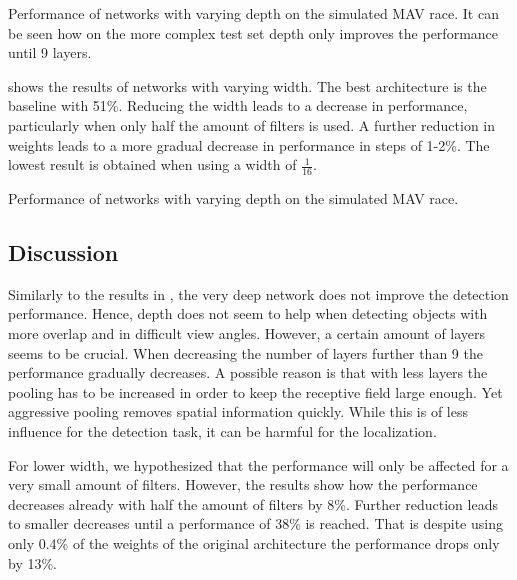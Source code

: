 \begin{table}[hbtp]
	\centering
	
	\caption{Performance of networks with varying depth on the simulated \ac{MAV} race. It can be seen how on the more complex test set depth only improves the performance until 9 layers.}
	\label{tab:depth}
\end{table}

 shows the results of networks with varying width. The best architecture is the baseline with 51\%. Reducing the width leads to a decrease in performance, particularly when only half the amount of filters is used. A further reduction in weights leads to a more gradual decrease in performance in steps of 1-2\%. The lowest result is obtained when using a width of $\frac{1}{16}$.

\begin{table}[hbtp]
	\centering
	
	\caption{Performance of networks with varying depth on the simulated \ac{MAV} race. }
	\label{tab:width}
\end{table}

\subsection{Discussion}

Similarly to the results in , the very deep network does not improve the detection performance. Hence, depth does not seem to help when detecting objects with more overlap and in difficult view angles. However, a certain amount of layers seems to be crucial. When decreasing the number of layers further than 9 the performance gradually decreases. A possible reason is that with less layers the pooling has to be increased in order to keep the receptive field large enough. Yet aggressive pooling removes spatial information quickly. While this is of less influence for the detection task, it can be harmful for the localization. 

For lower width, we hypothesized that the performance will only be affected for a very small amount of filters. However, the results show how the performance decreases already with half the amount of filters by 8\%. Further reduction leads to smaller decreases until a performance of 38\% is reached. That is despite using only 0.4\% of the weights of the original architecture the performance drops only by 13\%. 


